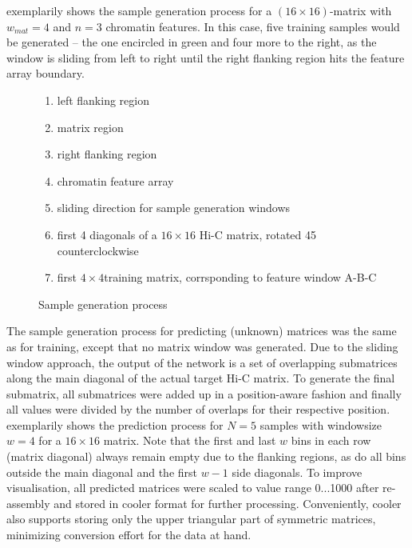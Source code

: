  exemplarily shows the sample generation process for a $(16\times16)$-matrix with $w_\mathit{mat}=4$ and $n=3$ chromatin features.
In this case, five training samples would be generated -- the one encircled in green and four more to the right, as the window is sliding from left to right until the
right flanking region hits the feature array boundary.
\begin{figure}[hbp]
 \begin{minipage}{0.65\textwidth}
    \caption{Sample generation process}
    \label{fig:methods:sample_gen}
 \end{minipage}\hfill
 \begin{minipage}{0.3\textwidth}
 \scriptsize
  \begin{enumerate}[label=\Alph*:,leftmargin=*]
   \raggedright
    \item left flanking region
    \item matrix region
    \item right flanking region
    \item chromatin feature array
    \item sliding direction for sample generation windows
    \item first 4 diagonals of a $16\times16$ Hi-C matrix, rotated \SI{45}{\deg} counterclockwise
    \item first $4\times4$training matrix, corrsponding to feature window A-B-C
\end{enumerate}
 \end{minipage}
\end{figure}

The sample generation process for predicting (unknown) matrices was the same as for training,
except that no matrix window was generated.
Due to the sliding window approach, the output of the network is a set of overlapping submatrices along the main diagonal of the actual target Hi-C matrix.
To generate the final submatrix, all submatrices were added up in a position-aware fashion 
and finally all values were divided by the number of overlaps for their respective position.
 exemplarily shows the prediction process for $N=5$ samples with windowsize $w=4$ for a $16\times16$ matrix.
Note that the first and last $w$ bins in each row (matrix diagonal) always remain empty due to the flanking regions,
as do all bins outside the main diagonal and the first $w-1$ side diagonals.
To improve visualisation, all predicted matrices were scaled to value range 0...1000 after re-assembly and stored in cooler format for further processing.
Conveniently, cooler also supports storing only the upper triangular part of symmetric matrices, minimizing conversion effort for the data at hand.

